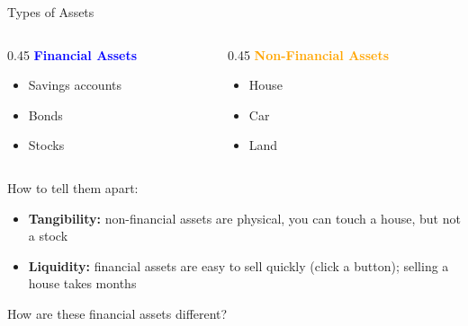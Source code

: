 \documentclass[9pt,english,aspectratio=169]{beamer}
\begin{document}
\begin{frame}{Types of Assets}

  \begin{columns}[T]
    \begin{column}{0.45\textwidth}
      \textcolor{blue}{\textbf{Financial Assets}}
      \begin{itemize}
        \item Savings accounts
        \item Bonds
        \item Stocks
      \end{itemize}
    \end{column}
    \begin{column}{0.45\textwidth}
      \textcolor{orange}{\textbf{Non-Financial Assets}}
      \begin{itemize}
        \item House
        \item Car
        \item Land
      \end{itemize}
    \end{column}
  \end{columns}
  \pause
  \vspace{1.5em}
  How to tell them apart:
  \begin{itemize}
    \item \textbf{Tangibility:} non-financial assets are physical, you can touch a house, but not a stock
    \item \textbf{Liquidity:} financial assets are easy to sell quickly (click a button); selling a house takes months
  \end{itemize}
  \vspace{1em}

  \pause 
  \begin{questionbox}
    How are these financial assets different? 
  \end{questionbox}

\end{frame}
\end{document}
